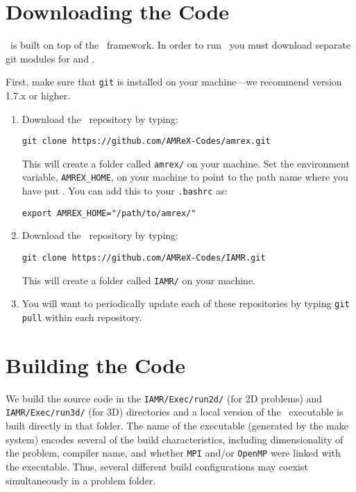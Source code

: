 
\section{Downloading the Code}

\iamr\ is built on top of the \amrex\ framework.  In order to run
\iamr\, you must download separate git modules for \iamr and \amrex.

\vspace{.1in}

\noindent First, make sure that {\tt git} is installed on your machine---we recommend version 1.7.x or higher.

\vspace{.1in}

\begin{enumerate}

\item Download the \amrex\ repository by typing: 
\begin{verbatim}
git clone https://github.com/AMReX-Codes/amrex.git
\end{verbatim}

This will create a folder called {\tt amrex/} on your machine.
Set the environment variable, {\tt AMREX\_HOME}, on your
machine to point to the path name where you have put \amrex.
You can add this to your {\tt .bashrc} as:
\begin{verbatim}
export AMREX_HOME="/path/to/amrex/"
\end{verbatim}

\item Download the \iamr\ repository by typing: 
\begin{verbatim}
git clone https://github.com/AMReX-Codes/IAMR.git
\end{verbatim}

This will create a folder called {\tt IAMR/} on your machine.

\item You will want to periodically update each of these repositories
by typing {\tt git pull} within each repository.

\end{enumerate}


\section{Building the Code}

We build the source code in the {\tt IAMR/Exec/run2d/} (for 2D problems) and {\tt IAMR/Exec/run3d/} 
(for 3D) directories and a local version of the 
\iamr\ executable is built directly in that folder.  The name of the executable (generated by the make
system) encodes several of the build characteristics, including dimensionality of the problem,
compiler name, and whether {\tt MPI} and/or {\tt OpenMP} were linked with the executable.
Thus, several different build configurations may coexist simultaneously in a problem folder.

